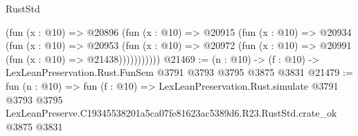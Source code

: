\begin{lexlean}{RustStd}
\begin{coremodule}
            (fun (x : @10) =>
            @20896
              (fun (x : @10) =>
              @20915
                (fun (x : @10) =>
                @20934
                  (fun (x : @10) =>
                  @20953
                    (fun (x : @10) =>
                    @20972 (fun (x : @10) => @20991 (fun (x : @10) => @21438)))))))))))
@21469 := (n : @10) -> (f : @10) -> LexLeanPreservation.Rust.FunSem @3791 @3793 @3795 @3875 @3831
@21479 := fun (n : @10) =>
  fun (f : @10) =>
  LexLeanPreservation.Rust.simulate
    @3791
    @3793
    @3795
    LexLeanPreserve.C19345538201a5ca07fe81623ac5389d6.R23.RustStd.crate_ok
    @3875
    @3831
\end{coremodule}
\end{lexlean}

